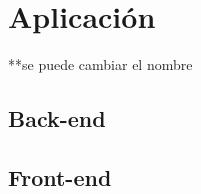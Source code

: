\chapter{Aplicación}
\label{cap:descripcionTrabajo}

**se puede cambiar el nombre

\section{Back-end}




\section{Front-end}